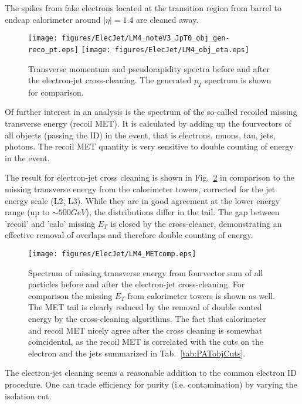 \documentclass{cmspaper}
\begin{document}
The spikes from fake electrons located at the transition region from barrel to
endcap calorimeter around $|\eta|=1.4$ are cleaned away.

\begin{figure}[htb]
\begin{center}
    \texttt{[image: figures/ElecJet/LM4\_noteV3\_JpT0\_obj\_gen-reco\_pt.eps]}
    \texttt{[image: figures/ElecJet/LM4\_obj\_eta.eps]}
    \caption{Transverse momentum and pseudorapidity spectra before
    and after the electron-jet cross-cleaning. The generated $p_T$ spectrum is
    shown for comparison.}
\label{fig:objSpectra_ElecJet}
\end{center}
\end{figure}

Of further interest in an analysis is the spectrum of the so-called recoiled
missing transverse energy (recoil MET). It is calculated by adding up the
fourvectors of all objects (passing the ID) in the event, that is electrons,
muons, tau, jets, photons. The recoil MET quantity is very sensitive to
double counting of energy in the event.

The result for electron-jet cross cleaning is shown in Fig.~\ref{fig:met_ElecJet} in comparison to the missing transverse energy from the
calorimeter towers, corrected for the jet energy scale (L2, L3). While they are
in good agreement at the lower energy range (up to \(\sim 500 GeV\)), the
distributions differ in the tail. The gap between 'recoil' and 'calo' missing
$E_T$ is closed by the cross-cleaner, demonstrating an effective removal of
overlaps and therefore double counting of energy.

\begin{figure}[htb]
\begin{center}
    \texttt{[image: figures/ElecJet/LM4\_METcomp.eps]}
    \caption{Spectrum of missing transverse energy from fourvector sum of all
    particles before and after the electron-jet cross-cleaning. For comparison
    the missing $E_T$ from calorimeter towers is shown as well. The MET tail is
    clearly reduced by the removal of double conted energy by the cross-cleaning
    algorithms. The fact that calorimeter and recoil MET nicely agree after the
    cross cleaning is somewhat coincidental, as the recoil MET is correlated
    with the cuts on the electron and the jets summarized in Tab.~\ref{tab:PATobjCuts}.}
\label{fig:met_ElecJet}
\end{center}
\end{figure}
The electron-jet cleaning seems a reasonable addition to the common
electron ID procedure. One can trade efficiency for purity (i.e. contamination)
by varying the isolation cut.
\end{document}
